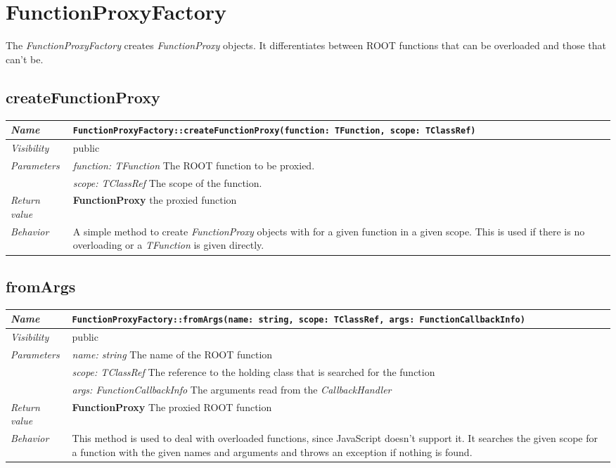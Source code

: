 \chapter{FunctionProxyFactory}
The \textit{FunctionProxyFactory} creates \textit{FunctionProxy} objects. It differentiates between ROOT functions that can be overloaded and those that can't be.
\section{createFunctionProxy}
\begin{longtable}{p{3cm} @{\hskip 1cm} p{12cm}}
 \hline
\textit{Name} & \texttt{FunctionProxyFactory::createFunctionProxy(function: TFunction, scope: TClassRef)}\\
\hline
 \textit{Visibility} & public\\
\hline
\textit{Parameters} & \textit{function: TFunction} The ROOT function to be proxied. \\ 
& \textit{scope: TClassRef} The scope of the function.\\
\hline
\textit{Return value} & \textbf{FunctionProxy} the proxied function\\
  \hline
 \textit{Behavior} & A simple method to create \textit{FunctionProxy} objects with for a given function in a given scope. This is used if there is no overloading or a \textit{TFunction} is given directly.\\
\hline
\end{longtable} \pagebreak
 \section{fromArgs}
\begin{longtable}{p{3cm} @{\hskip 1cm} p{12cm}}
 \hline	
\textit{Name} & \texttt{FunctionProxyFactory::fromArgs(name: string, scope: TClassRef, args: FunctionCallbackInfo)}\\
\hline
 \textit{Visibility} & public\\
\hline
\textit{Parameters} & \textit{name: string} The name of the ROOT function \\ & \textit{scope: TClassRef} The reference to the holding class that is searched for the function \\ &\textit{args: FunctionCallbackInfo} The arguments read from the \textit{CallbackHandler}\\
\hline
\textit{Return value} & \textbf{FunctionProxy} The proxied ROOT function\\
  \hline
 \textit{Behavior} & This method is used to deal with overloaded functions, since JavaScript doesn't support it. It searches the given scope for a function with the given names and arguments and throws an exception if nothing is found.\\
\hline
\end{longtable} \pagebreak
